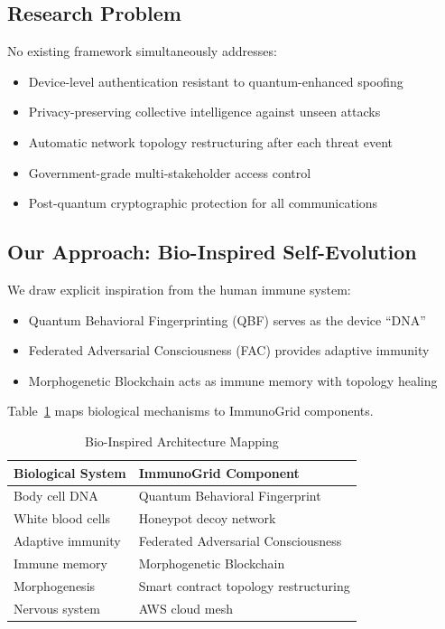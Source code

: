 \subsection{Research Problem}

No existing framework simultaneously addresses:
\begin{itemize}
  \item Device-level authentication resistant to quantum-enhanced spoofing
  \item Privacy-preserving collective intelligence against unseen attacks
  \item Automatic network topology restructuring after each threat event
  \item Government-grade multi-stakeholder access control
  \item Post-quantum cryptographic protection for all communications
\end{itemize}

\subsection{Our Approach: Bio-Inspired Self-Evolution}

We draw explicit inspiration from the human immune system:
\begin{itemize}
  \item Quantum Behavioral Fingerprinting (QBF) serves as the device ``DNA''
  \item Federated Adversarial Consciousness (FAC) provides adaptive immunity
  \item Morphogenetic Blockchain acts as immune memory with topology healing
\end{itemize}

Table~\ref{tab:bio_analogy} maps biological mechanisms to ImmunoGrid components.

\begin{table}[h]
\caption{Bio-Inspired Architecture Mapping}
\label{tab:bio_analogy}
\centering
\begin{tabular}{ll}
\toprule
\textbf{Biological System} & \textbf{ImmunoGrid Component} \\
\midrule
Body cell DNA       & Quantum Behavioral Fingerprint \\
White blood cells   & Honeypot decoy network \\
Adaptive immunity   & Federated Adversarial Consciousness \\
Immune memory       & Morphogenetic Blockchain \\
Morphogenesis       & Smart contract topology restructuring \\
Nervous system      & AWS cloud mesh \\
\bottomrule
\end{tabular}
\end{table}

